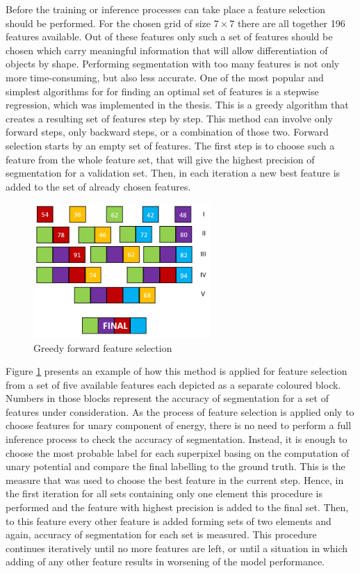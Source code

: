 Before the training or inference processes can take place a feature selection should be performed. For the chosen grid of size $7 \times 7$ there are all together 196 features available. Out of these features only such a set of features should be chosen which carry meaningful information that will allow differentiation of objects by shape. Performing segmentation with too many features is not only more time-consuming, but also less accurate. One of the most popular and simplest algorithms for for finding an optimal set of features is a stepwise regression, which was implemented in the thesis. This is a greedy algorithm that creates a resulting set of features step by step. This method can involve only forward steps, only backward steps, or a combination of those two. Forward selection starts by an empty set of features. The first step is to choose such a feature from the whole feature set, that will give the highest precision of segmentation for a validation set. Then, in each iteration a new best feature is added to the set of already chosen features. 
\begin{figure}[ht]
    \centering
    \includegraphics[width=0.60\textwidth]{images/nonlinear_intro/greedy_forward.png}
    \caption{Greedy forward feature selection}
    \label{fig:greedy_selection}
\end{figure}
Figure \ref{fig:greedy_selection} presents an example of how this method is applied for feature selection from a set of five available features each depicted as a separate coloured block. Numbers in those blocks represent the accuracy of segmentation for a set of features under consideration. As the process of feature selection is applied only to choose features for unary component of energy, there is no need to perform a full inference process to check the accuracy of segmentation. Instead, it is enough to choose the most probable label for each superpixel basing on the computation of unary potential and compare the final labelling to the ground truth. This is the measure that was used to choose the best feature in the current step. Hence, in the first iteration for all sets containing only one element this procedure is performed and the feature with highest precision is added to the final set. Then, to this feature every other feature is added forming sets of two elements and again, accuracy of segmentation for each set is measured. This procedure continues iteratively until no more features are left, or until a situation in which adding of any other feature results in worsening of the model performance. 
